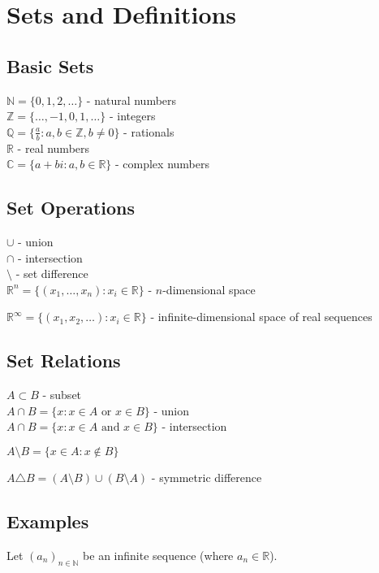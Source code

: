 \documentclass[12pt,a4paper]{article}
\begin{document}
\section{Sets and Definitions}

\subsection{Basic Sets}
$\mathbb{N} = \{0, 1, 2, \ldots\}$ - natural numbers \\
$\mathbb{Z} = \{\ldots, -1, 0, 1, \ldots\}$ - integers \\
$\mathbb{Q} = \{\frac{a}{b} : a, b \in \mathbb{Z}, b \neq 0\}$ - rationals \\
$\mathbb{R}$ - real numbers \\
$\mathbb{C} = \{a + bi : a, b \in \mathbb{R}\}$ - complex numbers

\subsection{Set Operations}
$\cup$ - union \\
$\cap$ - intersection \\
$\setminus$ - set difference \\
$\mathbb{R}^n = \{(x_1, \ldots, x_n) : x_i \in \mathbb{R}\}$ - $n$-dimensional space

$\mathbb{R}^\infty = \{(x_1, x_2, \ldots) : x_i \in \mathbb{R}\}$ - infinite-dimensional space of real sequences

\subsection{Set Relations}
$A \subset B$ - subset \\
$A \cap B = \{x : x \in A \text{ or } x \in B\}$ - union \\
$A \cap B = \{x : x \in A \text{ and } x \in B\}$ - intersection

\begin{center}
$A \setminus B = \{x \in A : x \notin B\}$
\end{center}

$A \triangle B = (A \setminus B) \cup (B \setminus A)$ - symmetric difference

\subsection{Examples}
Let $(a_n)_{n \in \mathbb{N}}$ be an infinite sequence (where $a_n \in \mathbb{R}$).
\end{document}
